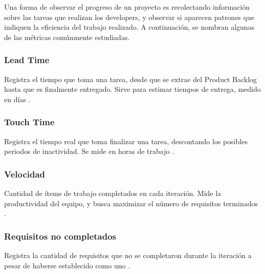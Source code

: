 \par Una forma de observar el progreso de un proyecto es recolectando información sobre las tareas que realizan los developers, y observar si aparecen patrones que indiquen la eficiencia del trabajo realizado. A continuación, se nombran algunas de las métricas comúnmente estudiadas.
%
\subsubsection{Lead Time}
\par Registra el tiempo que toma una tarea, desde que se extrae del Product Backlog hasta que es finalmente entregado. Sirve para estimar tiempos de entrega, medido en días \cite{gaeteEnfoqueAplicacionAgil2021}.
%
\subsubsection{Touch Time}
Registra el tiempo real que toma finalizar una tarea, descontando los posibles periodos de inactividad. Se mide en horas de trabajo \cite{gaeteEnfoqueAplicacionAgil2021}.
%
\subsubsection{Velocidad}
Cantidad de ítems de trabajo completados en cada iteración. Mide la productividad del equipo, y busca maximizar el número de requisitos terminados \cite{gaeteEnfoqueAplicacionAgil2021}.
%
\subsubsection{Requisitos no completados}
Registra la cantidad de requisitos que no se completaron durante la iteración a pesar de haberse establecido como uno \cite{gaeteEnfoqueAplicacionAgil2021}.
